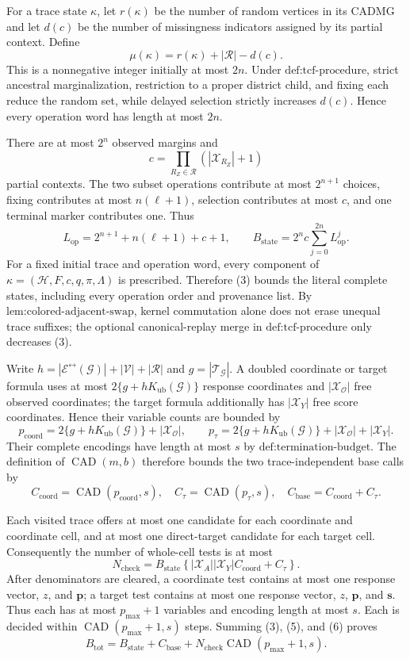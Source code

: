 For a trace state \(\kappa\), let \(r(\kappa)\) be the number of random vertices in its CADMG and let \(d(c)\) be the number of missingness indicators assigned by its partial context. Define
\[
\mu(\kappa)=r(\kappa)+|\mathcal R|-d(c).
\tag{1}
\]
This is a nonnegative integer initially at most \(2n\). Under \(\text{def:tcf-procedure}\), strict ancestral marginalization, restriction to a proper district child, and fixing each reduce the random set, while delayed selection strictly increases \(d(c)\). Hence every operation word has length at most \(2n\).

There are at most \(2^n\) observed margins and
\[
c=\prod_{R_Z\in\mathcal R}(|\mathcal X_{R_Z}|+1)
\tag{2}
\]
partial contexts. The two subset operations contribute at most \(2^{n+1}\) choices, fixing contributes at most \(n(\ell+1)\), selection contributes at most \(c\), and one terminal marker contributes one. Thus
\[
L_{\mathrm{op}}=2^{n+1}+n(\ell+1)+c+1,
\qquad
B_{\mathrm{state}}=2^n c\sum_{j=0}^{2n}L_{\mathrm{op}}^j.
\tag{3}
\]
For a fixed initial trace and operation word, every component of \(\kappa=(\mathcal H,F,c,q,\pi,\Lambda)\) is prescribed. Therefore (3) bounds the literal complete states, including every operation order and provenance list. By \(\text{lem:colored-adjacent-swap}\), kernel commutation alone does not erase unequal trace suffixes; the optional canonical-replay merge in \(\text{def:tcf-procedure}\) only decreases (3).

Write \(h=|\mathcal E^{\leftrightarrow}(\mathcal G)|+|\mathcal V|+|\mathcal R|\) and \(g=|\mathcal T_{\mathcal G}|\). A doubled coordinate or target formula uses at most \(2\{g+hK_{\mathrm{ub}}(\mathcal G)\}\) response coordinates and \(|\mathcal X_{\mathcal O}|\) free observed coordinates; the target formula additionally has \(|\mathcal X_Y|\) free score coordinates. Hence their variable counts are bounded by
\[
p_{\mathrm{coord}}=2\{g+hK_{\mathrm{ub}}(\mathcal G)\}+|\mathcal X_{\mathcal O}|,
\qquad
p_{\tau}=2\{g+hK_{\mathrm{ub}}(\mathcal G)\}+|\mathcal X_{\mathcal O}|+|\mathcal X_Y|.
\tag{4}
\]
Their complete encodings have length at most \(s\) by \(\text{def:termination-budget}\). The definition of \(\operatorname{CAD}(m,b)\) therefore bounds the two trace-independent base calls by
\[
C_{\mathrm{coord}}=\operatorname{CAD}(p_{\mathrm{coord}},s),
\quad
C_{\tau}=\operatorname{CAD}(p_{\tau},s),
\quad
C_{\mathrm{base}}=C_{\mathrm{coord}}+C_{\tau}.
\tag{5}
\]

Each visited trace offers at most one candidate for each coordinate and coordinate cell, and at most one direct-target candidate for each target cell. Consequently the number of whole-cell tests is at most
\[
N_{\mathrm{check}}
=B_{\mathrm{state}}
\left\{|\mathcal X_A||\mathcal X_Y|C_{\mathrm{coord}}+C_{\tau}\right\}.
\tag{6}
\]
After denominators are cleared, a coordinate test contains at most one response vector, \(z\), and \(\mathbf p\); a target test contains at most one response vector, \(z\), \(\mathbf p\), and \(\mathbf s\). Thus each has at most \(p_{\max}+1\) variables and encoding length at most \(s\). Each is decided within \(\operatorname{CAD}(p_{\max}+1,s)\) steps. Summing (3), (5), and (6) proves
\[
B_{\mathrm{tot}}
=B_{\mathrm{state}}+C_{\mathrm{base}}
+N_{\mathrm{check}}\operatorname{CAD}(p_{\max}+1,s).
\tag{7}
\]

